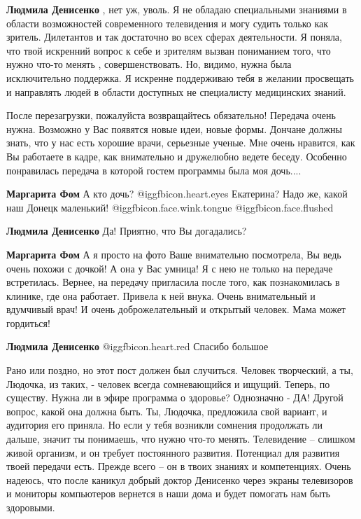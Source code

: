 \begin{itemize}
\begin{itemize}
\textbf{Людмила Денисенко} , нет уж, уволь. Я не обладаю специальными знаниями в области возможностей современного телевидения и могу судить только как зритель. Дилетантов и так достаточно во всех сферах деятельности.
Я поняла, что твой искренний вопрос к себе и зрителям вызван пониманием того, что нужно что-то менять , совершенствовать. Но, видимо, нужна была исключительно поддержка.
Я искренне поддерживаю тебя в желании просвещать и направлять людей в области доступных не специалисту медицинских знаний.
\end{itemize} %


После перезагрузки, пожалуйста возвращайтесь обязательно! Передача очень нужна.
Возможно у Вас появятся новые идеи, новые формы. Дончане должны знать, что у
нас есть хорошие врачи, серьезные ученые. Мне очень нравится, как Вы работаете
в кадре, как внимательно и дружелюбно ведете беседу. Особенно понравилась
передача в которой гостем программы была моя дочь....

\begin{itemize} %
\textbf{Маргарита Фом} А кто дочь?  @igg{fbicon.heart.eyes}  Екатерина? Надо же, какой наш Донецк маленький!  @igg{fbicon.face.wink.tongue}  @igg{fbicon.face.flushed} 

\textbf{Людмила Денисенко} Да! Приятно, что Вы догадались?

\textbf{Маргарита Фом} А я просто на фото Ваше внимательно посмотрела, Вы ведь очень похожи с дочкой! А она у Вас умница! Я с нею не только на передаче встретилась. Вернее, на передачу пригласила после того, как познакомилась в клинике, где она работает. Привела к ней внука. Очень внимательный и вдумчивый врач! И очень доброжелательный и открытый человек. Мама может гордиться!

\textbf{Людмила Денисенко} @igg{fbicon.heart.red} Спасибо большое
\end{itemize} %


Рано или поздно, но этот пост должен был случиться. Человек творческий, а ты,
Людочка, из таких, - человек всегда сомневающийся и ищущий. Теперь, по
существу. Нужна ли в эфире программа о здоровье? Однозначно - ДА! Другой
вопрос, какой она должна быть. Ты, Людочка, предложила свой вариант, и
аудитория его приняла. Но если у тебя возникли сомнения продолжать ли дальше,
значит ты понимаешь, что нужно что-то менять. Телевидение – слишком живой
организм, и он требует постоянного развития. Потенциал для развития твоей
передачи есть. Прежде всего – он в твоих знаниях и компетенциях. Очень надеюсь,
что после каникул добрый доктор Денисенко через экраны телевизоров и мониторы
компьютеров вернется в наши дома и будет помогать нам быть здоровыми.


\end{itemize}
